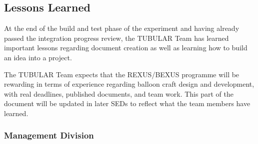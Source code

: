 \pagebreak
\subsection{Lessons Learned}
At the end of the build and test phase of the experiment and having already passed the integration progress review, the TUBULAR Team has learned important lessons regarding document creation as well as learning how to build an idea into a project. \par
The TUBULAR Team expects that the REXUS/BEXUS programme will be rewarding in terms of experience regarding balloon craft design and development, with real deadlines, published documents, and team work. This part of the document will be updated in later SEDs to reflect what the team members have learned.

\subsubsection{Management Division}

